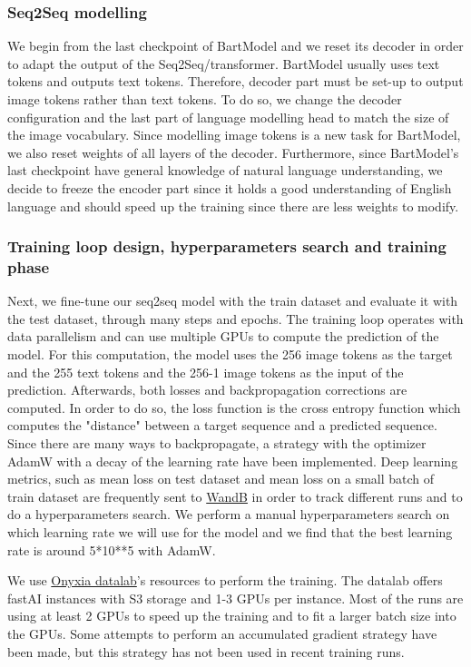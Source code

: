 \documentclass{article}
\begin{document}
\subsubsection{Seq2Seq modelling}
We begin from the last checkpoint of BartModel and we reset its decoder in order to adapt the output of the Seq2Seq/transformer. BartModel usually uses text tokens and outputs text tokens. Therefore, decoder part must be set-up to output image tokens rather than text tokens. To do so, we change the decoder configuration and the last part of language modelling head to match the size of the image vocabulary. Since modelling image tokens is a new task for BartModel, we also reset weights of all layers of the decoder.
Furthermore, since BartModel's last checkpoint have general knowledge of natural language understanding, we decide to freeze the encoder part since it holds a good understanding of English language and should speed up the training since there are less weights to modify.

\subsubsection{Training loop design, hyperparameters search and training phase}
Next, we fine-tune our seq2seq model with the train dataset and evaluate it with the test dataset, through many steps and epochs. The training loop operates with data parallelism and can use multiple GPUs to compute the prediction of the model. For this computation, the model uses the 256 image tokens as the target and the 255 text tokens and the 256-1 image tokens as the input of the prediction.
Afterwards, both losses and backpropagation corrections are computed. In order to do so, the loss function is the cross entropy function which computes the "distance" between a target sequence and a predicted sequence. Since there are many ways to backpropagate, a strategy with the optimizer AdamW with a decay of the learning rate have been implemented.
Deep learning metrics, such as mean loss on test dataset and mean loss on a small batch of train dataset are frequently sent to \href{https://wandb.ai/cthiounn/dalle-tiny}{WandB} in order to track different runs and to do a hyperparameters search.
We perform a manual hyperparameters search on which learning rate we will use for the model and we find that the best learning rate is around 5*10**5 with AdamW.

We use \href{https://datalab.sspcloud.fr/}{Onyxia datalab}'s resources to perform the training. The datalab offers fastAI instances with S3 storage and 1-3 GPUs per instance. Most of the runs are using at least 2 GPUs to speed up the training and to fit a larger batch size into the GPUs. Some attempts to perform an accumulated gradient strategy have been made, but this strategy has not been used in recent training runs.
\end{document}
